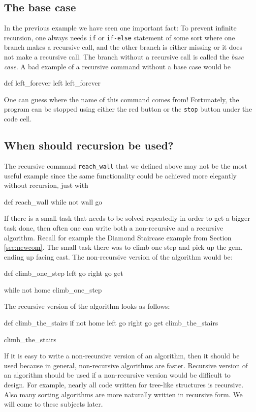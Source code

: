 \subsection{The base case}

In the previous example we have seen one important fact: To prevent infinite recursion, one always needs {\tt if} or {\tt if-else} 
statement of some sort where one branch makes a recursive call, and the other branch is either 
missing or it does not make a recursive call. The branch without a recursive 
call is called the {\em base case}. A bad example of a recursive command without a base case would be 

\begin{bluecode}
def left_forever
    left
    left_forever
\end{bluecode}
\noindent
One can guess where the name of this command comes from! Fortunately, the program can be stopped using 
either the red button or the {\tt stop} button under the code cell.

\subsection{When should recursion be used?}

The recursive command {\tt reach\_wall} that we defined above may not be the most useful example 
since the same functionality could be achieved more elegantly without recursion, just with

\begin{bluecode}
def reach_wall
    while not wall
        go
\end{bluecode}
If there is a small task that needs to be solved repeatedly in order to get a bigger task done,
then often one can write both a non-recursive and a recursive algorithm. Recall for example the Diamond
Staircase example from Section \ref{sec:newcom}. The small task there was to climb one step and pick 
up the gem, ending up facing east. The non-recursive version of the algorithm would be:

\begin{bluecode}
def climb_one_step
    left
    go
    right
    go
    get

while not home
    climb_one_step
\end{bluecode}
The recursive version of the algorithm looks as follows:

\begin{bluecode}
def climb_the_stairs
    if not home
        left
        go
        right
        go
        get
        climb_the_stairs

climb_the_stairs
\end{bluecode}
If it is easy to write a non-recursive version of an algorithm, then it should be used
because in general, non-recursive algorithms are faster. 
Recursive version of an algorithm should be used if a non-recursive version would 
be difficult to design. For example, nearly all code written for tree-like structures 
is recursive. Also many sorting algorithms are more naturally written in recursive form.
We will come to these subjects later.

